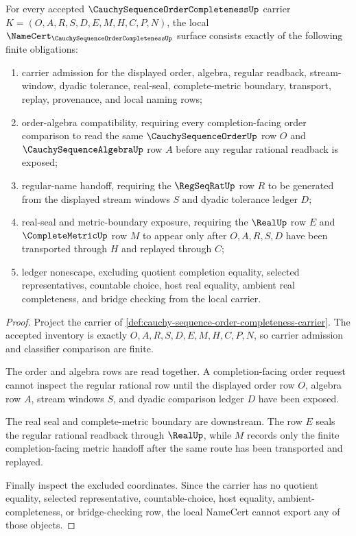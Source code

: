 \begin{theorem}
\label{thm:cauchy-sequence-order-completeness-namecert-obligations}
For every accepted $\CauchySequenceOrderCompletenessUp$ carrier $K=(O,A,R,S,D,E,M,H,C,P,N)$, the local $\NameCert_{\CauchySequenceOrderCompletenessUp}$ surface consists exactly of the following finite obligations:
\begin{enumerate}
\item carrier admission for the displayed order, algebra, regular readback, stream-window, dyadic tolerance, real-seal, complete-metric boundary, transport, replay, provenance, and local naming rows;
\item order-algebra compatibility, requiring every completion-facing order comparison to read the same $\CauchySequenceOrderUp$ row $O$ and $\CauchySequenceAlgebraUp$ row $A$ before any regular rational readback is exposed;
\item regular-name handoff, requiring the $\RegSeqRatUp$ row $R$ to be generated from the displayed stream windows $S$ and dyadic tolerance ledger $D$;
\item real-seal and metric-boundary exposure, requiring the $\RealUp$ row $E$ and $\CompleteMetricUp$ row $M$ to appear only after $O,A,R,S,D$ have been transported through $H$ and replayed through $C$;
\item ledger nonescape, excluding quotient completion equality, selected representatives, countable choice, host real equality, ambient real completeness, and bridge checking from the local carrier.
\end{enumerate}
\end{theorem}
\begin{proof}
Project the carrier of \autoref{def:cauchy-sequence-order-completeness-carrier}. The accepted inventory is exactly $O,A,R,S,D,E,M,H,C,P,N$, so carrier admission and classifier comparison are finite.

The order and algebra rows are read together. A completion-facing order request cannot inspect the regular rational row until the displayed order row $O$, algebra row $A$, stream windows $S$, and dyadic comparison ledger $D$ have been exposed.

The real seal and complete-metric boundary are downstream. The row $E$ seals the regular rational readback through $\RealUp$, while $M$ records only the finite completion-facing metric handoff after the same route has been transported and replayed.

Finally inspect the excluded coordinates. Since the carrier has no quotient equality, selected representative, countable-choice, host equality, ambient-completeness, or bridge-checking row, the local NameCert cannot export any of those objects.
\end{proof}

